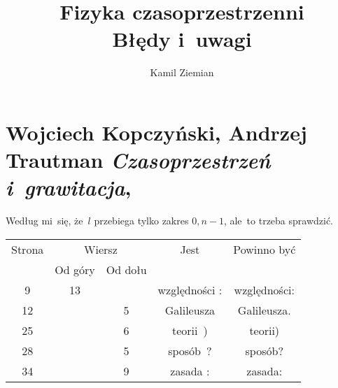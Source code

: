 \documentclass[a4paper,11pt]{article}
\title{Fizyka czasoprzestrzenni \\
  {\Large Błędy i~uwagi}}
\author{Kamil Ziemian}
\numberwithin{equation}{section}
\begin{document}





\maketitle





\section{Wojciech Kopczyński, Andrzej Trautman
  \textit{Czasoprzestrzeń i~grawitacja},
  \parencite{Kopczynski-Trautman-Czasoprzetrzen-i-grawitacja-Pub-1984}}

\label{sec:Uwagi-ogolne}




\vspace{0em}


\noindent
{} Według mi~się, że~$l$ przebiega tylko zakres $0, n - 1$, ale~to
trzeba sprawdzić.

\VerSpaceFour





\noindent
{}

\VerSpaceFour





\noindent
{}





\newpage



\begin{center}

  \begin{tabular}{|c|c|c|c|c|}
    \hline
    Strona & \multicolumn{2}{c|}{Wiersz} & Jest
                              & Powinno być \\ \cline{2-3}
    & Od góry & Od dołu & & \\
    \hline
    9   & 13 & & względności : & względności: \\
    12  & &  5 & Galileusza & Galileusza. \\
    25  & &  6 & teorii~) & teorii) \\
    28  & &  5 & sposób~? & sposób? \\
    34  & &  9 & zasada : & zasada: \\
    \hline
  \end{tabular}

\end{center}
\end{document}

